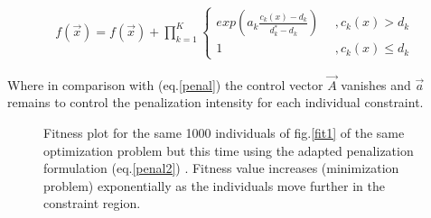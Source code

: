 \begin{eqnarray}
	f(\overrightarrow{x})=f(\overrightarrow{x})+ \prod _{k=1}^K{\left\{ 				\begin{array}{ll}
    exp(a_k\frac{c_k(x)-d_k}{d_k^* -d_k}) & ~~,c_k(x)>d_k\\
    1 & ~~,c_k(x)\leq d_k\end{array} \right. }
    \label{penal2}
\end{eqnarray}  

Where in comparison with (eq.\ref{penal}) the control vector $\overrightarrow{A}$ vanishes and $\overrightarrow{a}$ remains to control the penalization intensity for each individual constraint.

\begin{figure}[h!]
\begin{minipage}[b]{1.0\linewidth}
 \centering
\end{minipage}
\caption{Fitness plot for the same 1000 individuals of fig.\ref{fit1} of the same optimization problem but this time using the adapted penalization formulation (eq.\ref{penal2}) . Fitness value increases (minimization problem) exponentially as the individuals move further in the constraint region.}
\label{fit2}
\end{figure}








